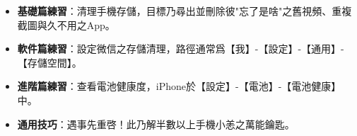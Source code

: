 
\begin{itemize}
  \item \textbf{基礎篇練習}：清理手機存儲，目標乃尋出並刪除彼"忘了是啥"之舊視頻、重複截圖與久不用之App。
  \item \textbf{軟件篇練習}：設定微信之存儲清理，路徑通常爲【我】-【設定】-【通用】-【存儲空間】。
  \item \textbf{進階篇練習}：查看電池健康度，iPhone於【設定】-【電池】-【電池健康】中。
  \item \textbf{通用技巧}：遇事先重啓！此乃解半數以上手機小恙之萬能鑰匙。
\end{itemize}
